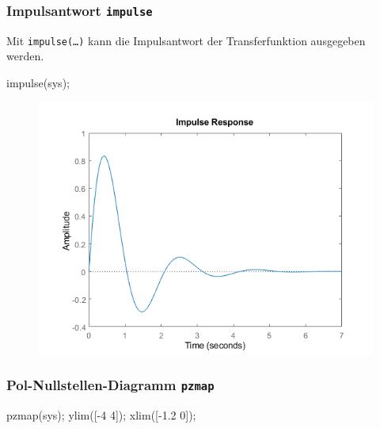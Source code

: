 \documentclass[
  10pt,
  a4paper,
  twocolumn]{article}
\newenvironment{Shaded}{}{}
\newcommand{\FloatTok}[1]{\textcolor[rgb]{0.00,0.36,0.77}{#1}}
\newcommand{\NormalTok}[1]{\textcolor[rgb]{0.14,0.16,0.18}{#1}}
\newcommand{\OperatorTok}[1]{\textcolor[rgb]{0.14,0.16,0.18}{#1}}
\newcommand{\VariableTok}[1]{\textcolor[rgb]{0.89,0.38,0.04}{#1}}
\numberwithin{equation}{section}
\begin{document}
\hypertarget{impulsantwort-impulse}{%
\subsubsection{\texorpdfstring{Impulsantwort
\texttt{impulse}}{Impulsantwort impulse}}\label{impulsantwort-impulse}}

Mit \texttt{impulse(…)} kann die Impulsantwort der Transferfunktion
ausgegeben werden.

\begin{Shaded}
\begin{Highlighting}[]
\VariableTok{impulse}\NormalTok{(}\VariableTok{sys}\NormalTok{)}\OperatorTok{;}
\end{Highlighting}
\end{Shaded}

\begin{figure}[H]

{\centering \includegraphics{images/matlab_ImpulseResponsePlot.png}

}

\end{figure}

\hypertarget{pol-nullstellen-diagramm-pzmap}{%
\subsubsection{\texorpdfstring{Pol-Nullstellen-Diagramm
\texttt{pzmap}}{Pol-Nullstellen-Diagramm pzmap}}\label{pol-nullstellen-diagramm-pzmap}}

\begin{Shaded}
\begin{Highlighting}[]
\VariableTok{pzmap}\NormalTok{(}\VariableTok{sys}\NormalTok{)}\OperatorTok{;}
\VariableTok{ylim}\NormalTok{([}\OperatorTok{{-}}\FloatTok{4} \FloatTok{4}\NormalTok{])}\OperatorTok{;} \VariableTok{xlim}\NormalTok{([}\OperatorTok{{-}}\FloatTok{1.2} \FloatTok{0}\NormalTok{])}\OperatorTok{;}
\end{Highlighting}
\end{Shaded}
\end{document}
